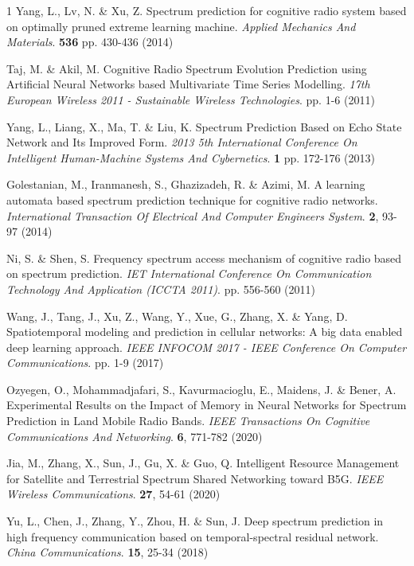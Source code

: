 \documentclass[lettersize,journal]{IEEEtran}
\begin{document}
\begin{thebibliography}{1}
Yang, L., Lv, N. \& Xu, Z. Spectrum prediction for cognitive radio system based on optimally pruned extreme learning machine. {\em Applied Mechanics And Materials}. \textbf{536} pp. 430-436 (2014)

Taj, M. \& Akil, M. Cognitive Radio Spectrum Evolution Prediction using Artificial Neural Networks based Multivariate Time Series Modelling. {\em 17th European Wireless 2011 - Sustainable Wireless Technologies}. pp. 1-6 (2011)

Yang, L., Liang, X., Ma, T. \& Liu, K. Spectrum Prediction Based on Echo State Network and Its Improved Form. {\em 2013 5th International Conference On Intelligent Human-Machine Systems And Cybernetics}. \textbf{1} pp. 172-176 (2013)

Golestanian, M., Iranmanesh, S., Ghazizadeh, R. \& Azimi, M. A learning automata based spectrum prediction technique for cognitive radio networks. {\em International Transaction Of Electrical And Computer Engineers System}. \textbf{2}, 93-97 (2014)

Ni, S. \& Shen, S. Frequency spectrum access mechanism of cognitive radio based on spectrum prediction. {\em IET International Conference On Communication Technology And Application (ICCTA 2011)}. pp. 556-560 (2011)

Wang, J., Tang, J., Xu, Z., Wang, Y., Xue, G., Zhang, X. \& Yang, D. Spatiotemporal modeling and prediction in cellular networks: A big data enabled deep learning approach. {\em IEEE INFOCOM 2017 - IEEE Conference On Computer Communications}. pp. 1-9 (2017)

Ozyegen, O., Mohammadjafari, S., Kavurmacioglu, E., Maidens, J. \& Bener, A. Experimental Results on the Impact of Memory in Neural Networks for Spectrum Prediction in Land Mobile Radio Bands. {\em IEEE Transactions On Cognitive Communications And Networking}. \textbf{6}, 771-782 (2020)

Jia, M., Zhang, X., Sun, J., Gu, X. \& Guo, Q. Intelligent Resource Management for Satellite and Terrestrial Spectrum Shared Networking toward B5G. {\em IEEE Wireless Communications}. \textbf{27}, 54-61 (2020)

Yu, L., Chen, J., Zhang, Y., Zhou, H. \& Sun, J. Deep spectrum prediction in high frequency communication based on temporal-spectral residual network. {\em China Communications}. \textbf{15}, 25-34 (2018)


\end{thebibliography}
\end{document}
